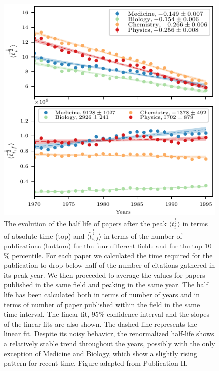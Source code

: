 \begin{figure}[htpb!]
\centering \large
\includegraphics[width=0.8\linewidth]{Figures/LastAbove_0_10_5_finalPaper.pdf}
\caption{ The evolution of the half life of papers after the peak $\langle t_{i}^{\frac{1}{2}} \rangle$ in terms of absolute time (top) and $\langle \widetilde{t}_{i,f}^{\frac{1}{2}} \rangle$  in terms of the number of publications (bottom)
for the four different fields and for the top 10$\%$ percentile. For each paper we calculated the time
required for the publication to drop below half of the number of citations gathered in its peak year. We then proceeded
to average the values for papers published in the same field and peaking in the same year. The half life has been calculated both in terms of number of years and in terms of number
of paper published within the field in the same time interval. 
The linear fit, $95\%$ confidence interval and the slopes of the linear fits are also shown. The dashed line represents the linear fit. Despite its noisy behavior, the
renormalized half-life shows a relatively stable trend throughout the years, possibly with the only exception of Medicine and
Biology, which show a slightly rising pattern for recent time. Figure adapted from Publication II.}
\label{fig:attention_decay}
\end{figure}

